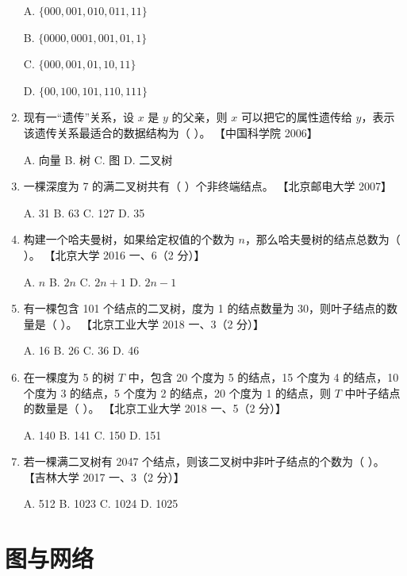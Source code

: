 \documentclass[lang=cn,newtx,10pt,scheme=chinese]{../../elegantbook}
\begin{document}
\begin{enumerate}
    A. $\{000, 001, 010, 011, 11\}$  

    B. $\{0000, 0001, 001, 01, 1\}$  

    C. $\{000, 001, 01, 10, 11\}$  

    D. $\{00, 100, 101, 110, 111\}$  

    \item 现有一“遗传”关系，设 $x$ 是 $y$ 的父亲，则 $x$ 可以把它的属性遗传给 $y$，表示该遗传关系最适合的数据结构为（ ）。  
    【中国科学院 2006】  

    A. 向量 \quad B. 树 \quad C. 图 \quad D. 二叉树  

    \item 一棵深度为 7 的满二叉树共有（ ）个非终端结点。  
    【北京邮电大学 2007】  

    A. 31 \quad B. 63 \quad C. 127 \quad D. 35  

    \item 构建一个哈夫曼树，如果给定权值的个数为 $n$，那么哈夫曼树的结点总数为（ ）。  
    【北京大学 2016 一、6（2 分）】

    A. $n$ \quad B. $2n$ \quad C. $2n + 1$ \quad D. $2n - 1$  

    \item 有一棵包含 101 个结点的二叉树，度为 1 的结点数量为 30，则叶子结点的数量是（ ）。  
    【北京工业大学 2018 一、3（2 分）】 

    A. 16 \quad B. 26 \quad C. 36 \quad D. 46  

    \item 在一棵度为 5 的树 $T$ 中，包含 20 个度为 5 的结点，15 个度为 4 的结点，10 个度为 3 的结点，5 个度为 2 的结点，20 个度为 1 的结点，则 $T$ 中叶子结点的数量是（ ）。  
    【北京工业大学 2018 一、5（2 分）】 

    A. 140 \quad B. 141 \quad C. 150 \quad D. 151  

    \item 若一棵满二叉树有 2047 个结点，则该二叉树中非叶子结点的个数为（ ）。  
    【吉林大学 2017 一、3（2 分）】

    A. 512 \quad B. 1023 \quad C. 1024 \quad D. 1025 



\end{enumerate}


\chapter{图与网络}
\end{document}

